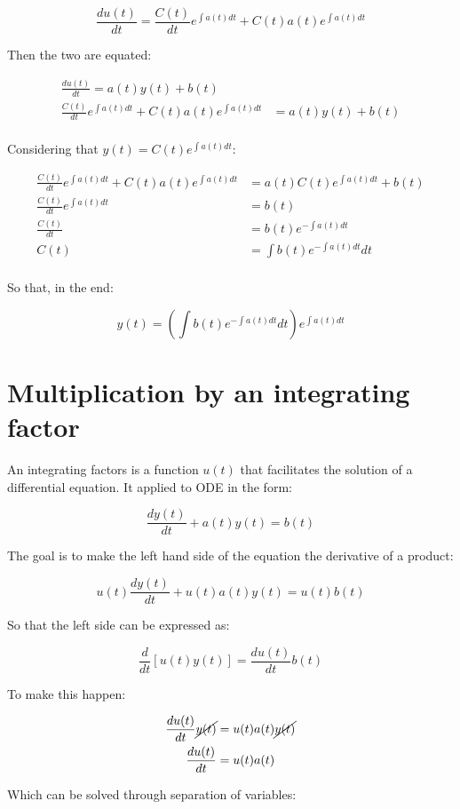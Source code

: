$$\frac{du(t)}{dt} = \frac{C(t)}{dt}e^{\int a(t)dt} + C(t)a(t)e^{\int a(t)dt}$$

Then the two are equated:

\begin{align*}
	\frac{du(t)}{dt} = a(t)y(t) + b(t)\\
	\frac{C(t)}{dt}e^{\int a(t)dt} + C(t)a(t)e^{\int a(t)dt} &= a(t)y(t) + b(t)\\
\end{align*}

Considering that $y(t) = C(t)e^{\int a(t)dt}$:

\begin{align*}
	\frac{C(t)}{dt}e^{\int a(t)dt} + C(t)a(t)e^{\int a(t)dt} &= a(t)C(t)e^{\int a(t)dt} + b(t)\\
	\frac{C(t)}{dt}e^{\int a(t)dt} &= b(t)\\
	\frac{C(t)}{dt} &= b(t)e^{-\int a(t)dt}\\
	C(t) &= \int b(t)e^{-\int a(t)dt}dt\\
\end{align*}

So that, in the end:

$$y(t) = \left(\int b(t)e^{-\int a(t)dt}dt\right)e^{\int a(t)dt}$$

\section{Multiplication by an integrating factor}
An integrating factors is a function $u(t)$ that facilitates the solution of a differential equation.
It applied to ODE in the form:

$$\frac{dy(t)}{dt} + a(t)y(t) = b(t)$$

The goal is to make the left hand side of the equation the derivative of a product:

$$u(t)\frac{dy(t)}{dt} + u(t)a(t)y(t) = u(t)b(t)$$

So that the left side can be expressed as:

$$\frac{d}{dt}\left[u(t)y(t)\right] = \frac{du(t)}{dt}b(t)$$

To make this happen:

\begin{align*}
	\frac{du(t)}{dt}\cancel{y(t)} &= u(t)a(t)\cancel{y(t)}\\
	\frac{du(t)}{dt} &= u(t)a(t)\\
\end{align*}

Which can be solved through separation of variables:

